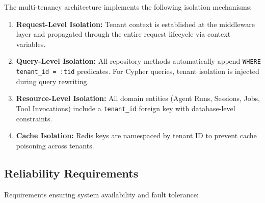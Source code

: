 The multi-tenancy architecture implements the following isolation mechanisms:

\begin{enumerate}
    \item \textbf{Request-Level Isolation:} Tenant context is established at the middleware layer and propagated through the entire request lifecycle via context variables.
    
    \item \textbf{Query-Level Isolation:} All repository methods automatically append \texttt{WHERE tenant\_id = :tid} predicates. For Cypher queries, tenant isolation is injected during query rewriting.
    
    \item \textbf{Resource-Level Isolation:} All domain entities (Agent Runs, Sessions, Jobs, Tool Invocations) include a \texttt{tenant\_id} foreign key with database-level constraints.
    
    \item \textbf{Cache Isolation:} Redis keys are namespaced by tenant ID to prevent cache poisoning across tenants.
\end{enumerate}

\subsection{Reliability Requirements}
\label{subsec:nfr-reliability}

Requirements ensuring system availability and fault tolerance:

